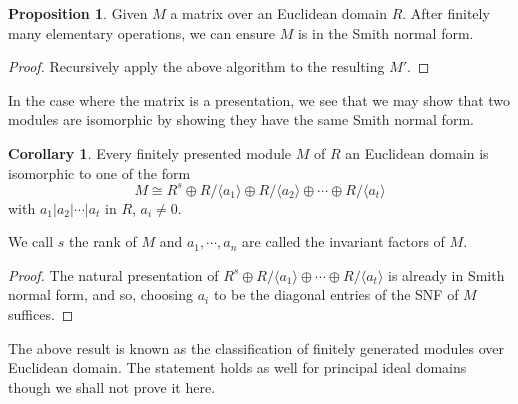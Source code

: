 \documentclass[]{article}
\theoremstyle{definition}
\newtheorem{corollary}{Corollary}[theorem]
\theoremstyle{definition}
\newtheorem{proposition}{Proposition}[section]
\begin{document}
\begin{proposition}
  Given \(M\) a matrix over an Euclidean domain \(R\). After finitely many 
  elementary operations, we can ensure \(M\) is in the Smith normal form.
\end{proposition}
\begin{proof}
  Recursively apply the above algorithm to the resulting \(M'\).
\end{proof}

In the case where the matrix is a presentation, we see that we may show that 
two modules are isomorphic by showing they have the same Smith normal form. 

\begin{corollary}
  Every finitely presented module \(M\) of \(R\) an Euclidean domain is isomorphic 
  to one of the form 
  \[M \cong R^s \oplus R / \langle a_1 \rangle \oplus R / \langle a_2 \rangle 
  \oplus \cdots \oplus R / \langle a_t \rangle\]
  with \(a_1 | a_2 | \cdots | a_t\) in \(R\), \(a_i \neq 0\).

  We call \(s\) the rank of \(M\) and \(a_1, \cdots, a_n\) are called the 
  invariant factors of \(M\).
\end{corollary}
\begin{proof}
  The natural presentation of \(R^s \oplus R / \langle a_1 \rangle 
  \oplus \cdots \oplus R / \langle a_t \rangle\) is already in Smith normal 
  form, and so, choosing \(a_i\) to be the diagonal entries of the SNF of 
  \(M\) suffices.
\end{proof}

The above result is known as the classification of finitely generated modules 
over Euclidean domain. The statement holds as well for principal ideal domains 
though we shall not prove it here.
\end{document}

